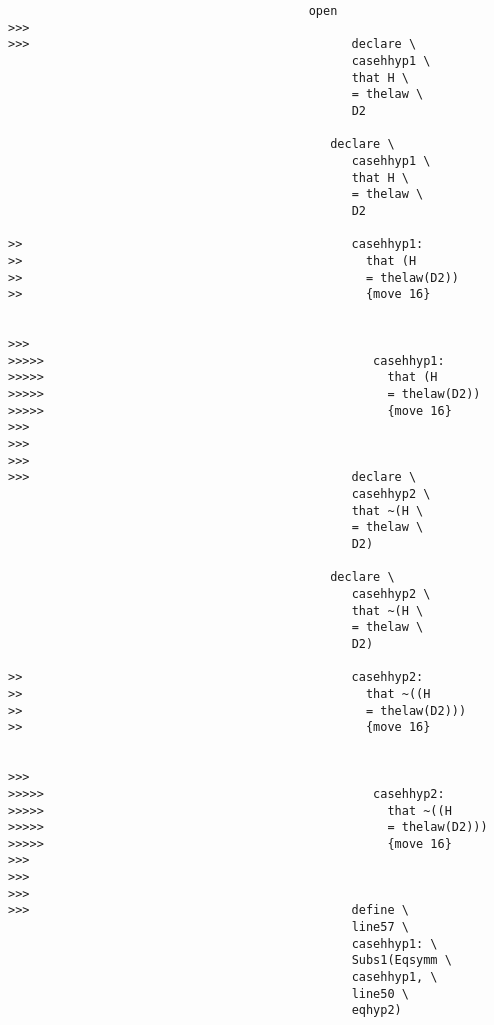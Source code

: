 \documentclass[12pt]{article}
\begin{document}
\begin{verbatim}
                                          open
>>>
>>>                                             declare \
                                                casehhyp1 \
                                                that H \
                                                = thelaw \
                                                D2

                                             declare \
                                                casehhyp1 \
                                                that H \
                                                = thelaw \
                                                D2

>>                                              casehhyp1:
>>                                                that (H
>>                                                = thelaw(D2))
>>                                                {move 16}


>>>
>>>>>                                              casehhyp1:
>>>>>                                                that (H
>>>>>                                                = thelaw(D2))
>>>>>                                                {move 16}
>>>
>>>
>>>
>>>                                             declare \
                                                casehhyp2 \
                                                that ~(H \
                                                = thelaw \
                                                D2)

                                             declare \
                                                casehhyp2 \
                                                that ~(H \
                                                = thelaw \
                                                D2)

>>                                              casehhyp2:
>>                                                that ~((H
>>                                                = thelaw(D2)))
>>                                                {move 16}


>>>
>>>>>                                              casehhyp2:
>>>>>                                                that ~((H
>>>>>                                                = thelaw(D2)))
>>>>>                                                {move 16}
>>>
>>>
>>>
>>>                                             define \
                                                line57 \
                                                casehhyp1: \
                                                Subs1(Eqsymm \
                                                casehhyp1, \
                                                line50 \
                                                eqhyp2)


\end{verbatim}
\end{document}
